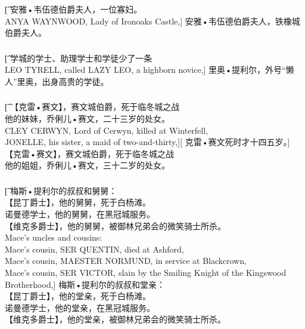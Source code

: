 \documentclass[12pt,a4paper]{article}
\begin{document}
\subsubsection{}\t[	
	{\large 安雅•韦伍德伯爵夫人}，一位寡妇。\\
	ANYA WAYNWOOD, Lady of Ironoaks Castle,]
	{\large 安雅•韦伍德伯爵夫}人，铁橡城伯爵夫人。
	
\subsubsection{}\t[
	学城的学士、助理学士和学徒{\color{red}少了一条}\\
	LEO TYRELL, called LAZY LEO, a highborn novice,]
	{\large 里奥•提利尔}，外号“懒人”里奥，出身高贵的学徒。
		
\subsubsection{}\t[
	【{\large 克雷•赛文}】，赛文城伯爵，死于临冬城之战\\
	他的妹妹，{\large 乔俐儿•赛文}，二十三岁的处女。\\
	{CLEY CERWYN}, Lord of Cerwyn, killed at Winterfell, \\
	JONELLE, his sister, a maid of two-and-thirty,][
	克雷•赛文死时才十四五岁。]
	【{\large 克雷•赛文}】，赛文城伯爵，死于临冬城之战\\
	他的姐姐，{\large 乔俐儿•赛文}，三十二岁的处女。
	
\subsubsection{}\t[		
	梅斯•提利尔的叔叔和舅舅：\\
	【{\large 昆丁爵士}】，他的舅舅，死于白杨滩。\\
	{\large 诺曼德学士}，他的舅舅，在黑冠城服务。\\
	【{\large 维克多爵士}】，他的舅舅，被御林兄弟会的微笑骑士所杀。\\
	Mace's uncles and cousins:\\
	Mace's cousin, {SER QUENTIN}, died at Ashford,\\
	Mace's cousin, MAESTER NORMUND, in service at Blackcrown,\\
	Mace's cousin, {SER VICTOR}, slain by the Smiling Knight of the Kingswood Brotherhood,]
	梅斯•提利尔的叔叔和堂亲：\\
	【{\large 昆丁爵士}】，他的堂亲，死于白杨滩。\\
	{\large 诺曼德学士}，他的堂亲，在黑冠城服务。\\
	【{\large 维克多爵士}】，他的堂亲，被御林兄弟会的微笑骑士所杀。
	
\end{document}

